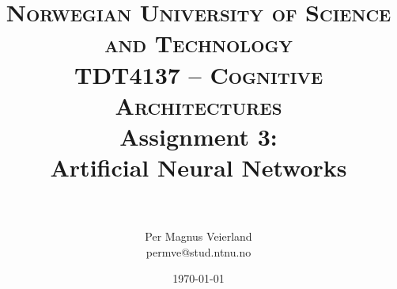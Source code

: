 

\title{	
\normalfont \normalsize 
\textsc{Norwegian University of Science and Technology\\TDT4137 -- Cognitive Architectures}
\horrule{0.5pt} \\[0.4cm]
\huge Assignment 3:\\ Artificial Neural Networks\\
\horrule{2pt} \\[0.5cm]
}

\author{Per Magnus Veierland\\permve@stud.ntnu.no}

\date{\normalsize\today}



\maketitle

